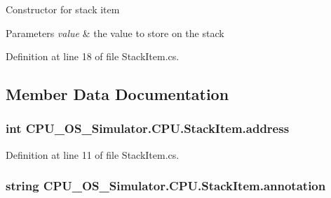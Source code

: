 Constructor for stack item 


\begin{DoxyParams}{Parameters}
{\em value} & the value to store on the stack\\
\hline
\end{DoxyParams}


Definition at line 18 of file Stack\+Item.\+cs.



\subsection{Member Data Documentation}
\hypertarget{class_c_p_u___o_s___simulator_1_1_c_p_u_1_1_stack_item_aa3d343371c939e5279496e374ba7da1c}{}
\subsubsection[{address}]{\setlength{\rightskip}{0pt plus 5cm}int C\+P\+U\+\_\+\+O\+S\+\_\+\+Simulator.\+C\+P\+U.\+Stack\+Item.\+address\hspace{0.3cm}{\ttfamily [private]}}\label{class_c_p_u___o_s___simulator_1_1_c_p_u_1_1_stack_item_aa3d343371c939e5279496e374ba7da1c}


Definition at line 11 of file Stack\+Item.\+cs.

\hypertarget{class_c_p_u___o_s___simulator_1_1_c_p_u_1_1_stack_item_ae73bf2077598fcf2849a0fb1024b2d77}{}
\subsubsection[{annotation}]{\setlength{\rightskip}{0pt plus 5cm}string C\+P\+U\+\_\+\+O\+S\+\_\+\+Simulator.\+C\+P\+U.\+Stack\+Item.\+annotation\hspace{0.3cm}{\ttfamily [private]}}\label{class_c_p_u___o_s___simulator_1_1_c_p_u_1_1_stack_item_ae73bf2077598fcf2849a0fb1024b2d77}


